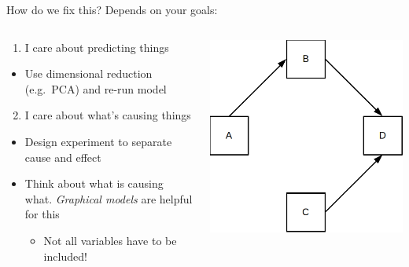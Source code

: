 \documentclass[
  ignorenonframetext,
  aspectratio=169]{beamer}
\providecommand{\tightlist}{%
  \setlength{\itemsep}{0pt}\setlength{\parskip}{0pt}}
\begin{document}
\begin{frame}[fragile]{How do we fix this? Depends on your goals:}
\protect\hypertarget{how-do-we-fix-this-depends-on-your-goals}{}
\begin{columns}[T]
\begin{column}{0.48\textwidth}
\begin{enumerate}[<+->]
\tightlist
\item
  I care about predicting things
\end{enumerate}

\begin{itemize}[<+->]
\tightlist
\item
  Use dimensional reduction (e.g.~PCA) and re-run model
\end{itemize}

\begin{enumerate}[<+->]
\setcounter{enumi}{1}
\tightlist
\item
  I care about what's causing things
\end{enumerate}

\begin{itemize}[<+->]
\tightlist
\item
  Design experiment to separate cause and effect
\item
  Think about what is causing what. \emph{Graphical models} are helpful
  for this

  \begin{itemize}[<+->]
  \tightlist
  \item
    Not all variables have to be included!
  \end{itemize}
\end{itemize}
\end{column}

\begin{column}{0.48\textwidth}
\includegraphics[width=0.8\linewidth]{./dag}


\end{column}
\end{columns}
\end{frame}
\end{document}
